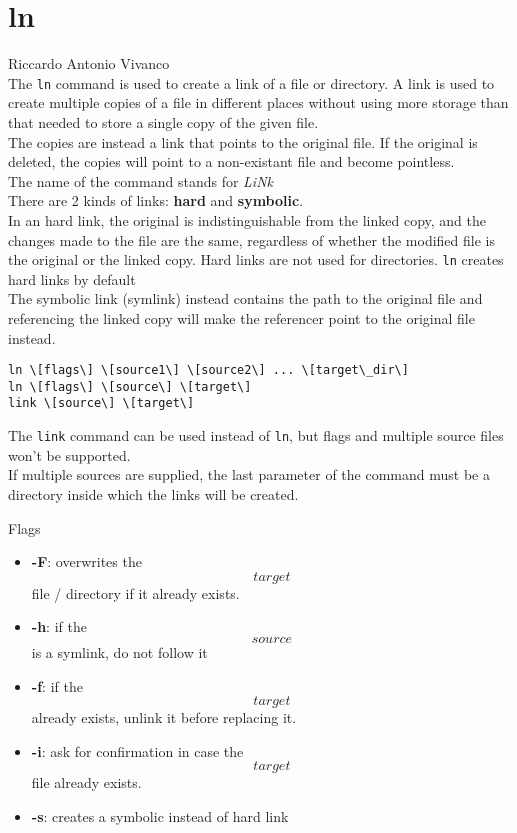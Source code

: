\documentclass[hidelinks,12pt,a4paper,numbers=enddot]{scrartcl}
\begin{document}
\section{ln}


\large Riccardo Antonio Vivanco \normalsize\\



The \texttt{ln} command is used to create a link of a file or directory.
A link is used to create multiple copies of a file in
different places without using more storage than that needed to store a single copy
of the given file.\\
The copies are instead a link that points to the original file. If the original is deleted,
the copies will point to a non-existant file and become pointless.\\
The name of the command stands for \emph{LiNk}\\

There are 2 kinds of links: \textbf{hard} and \textbf{symbolic}.\\

In an hard link, the original is indistinguishable from the linked copy, and the changes
made to the file are the same, regardless of whether the modified file is the
original or the linked copy. Hard links are not used for directories.
\texttt{ln} creates hard links by default\\

The symbolic link (symlink) instead contains the path to the original file and referencing the linked copy
will make the referencer point to the original file instead.\\

\begin{verbatim}
ln \[flags\] \[source1\] \[source2\] ... \[target\_dir\]
ln \[flags\] \[source\] \[target\]
link \[source\] \[target\]
\end{verbatim}

The \texttt{link} command can be used instead of \texttt{ln}, but flags and multiple
source files won't be supported.\\

If multiple sources are supplied, the last parameter of the command must be a directory inside
which the links will be created.

Flags

\begin{itemize}
    \item \textbf{-F}: overwrites the \[target\] file / directory if it already exists.
    \item \textbf{-h}: if the \[source\] is a symlink, do not follow it
    \item \textbf{-f}: if the \[target\] already exists, unlink it before replacing it.
    \item \textbf{-i}: ask for confirmation in case the \[target\] file already exists.
    \item \textbf{-s}: creates a symbolic instead of hard link
\end{itemize}
\end{document}
